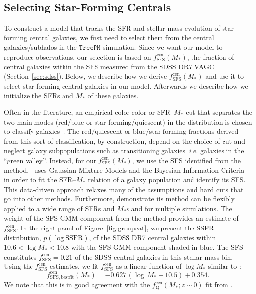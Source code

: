 \documentclass[12pt, letterpaper, preprint, tighten]{aastex62}
\newcommand{\beq}{\begin{equation}}
\newcommand{\eeq}{\end{equation}}
\begin{document}
\subsection{Selecting Star-Forming Centrals}  \label{sec:sfcen}
To construct a model that tracks the SFR and stellar mass evolution of 
star-forming central galaxies, we first need to select them from the 
central galaxies/subhalos in the $\mathtt{TreePM}$ simulation. Since 
we want our model to reproduce observations, our selection is based 
on $f^\mathrm{cen}_\mathrm{SFS}(M_*)$, the fraction of central galaxies 
within the SFS measured from the SDSS DR7 VAGC (Section~\ref{sec:sdss}). 
Below, we describe how we derive $f^\mathrm{cen}_\mathrm{SFS}(M_*)$ and 
use it to select star-forming central galaxies in our model. Afterwards 
we describe how we initialize the SFRs and $M_*$ of these galaxies.

Often in the literature, an empirical color-color or SFR--$M_*$ cut 
that separates the two main modes (red/blue or star-forming/quiescent) 
in the distribution is chosen to classify 
galaxies~\citep[\emph{e.g.}][]{baldry2006, blanton2009, drory2009, peng2010, moustakas2013, hahn2015}.
The red/quiescent or blue/star-forming fractions derived from this sort 
of classification, by construction, depend on the choice of cut and 
neglect galaxy subpopulations such as transitioning galaxies~\emph{i.e.} 
galaxies in the ``green valley''. Instead, for our $f^\mathrm{cen}_\mathrm{SFS}(M_*)$, 
we use the SFS identified from the \cite{hahn2018a} method. \cite{hahn2018a}~uses Gaussian 
Mixture Models and the Bayesian Information Criteria in order to fit the 
SFR--$M_*$ relation of a galaxy population and identify its SFS. This 
data-driven approach relaxes many of the assumptions and hard cuts that 
go into other methods. Furthermore, \cite{hahn2018a} demonstrate its method can 
be flexibly applied to a wide range of SFRs and $M_*$s and for multiple 
simulations. The weight of the SFS GMM component from the method provides 
an estimate of $f^\mathrm{cen}_\mathrm{SFS}$. In the right panel of 
Figure~\ref{fig:groupcat}, we present the SSFR distribution, $p(\log \mathrm{SSFR})$,
of the SDSS DR7 central galaxies within $10.6 < \log M_* < 10.8$ with 
the SFS GMM component shaded in blue. 
The SFS constitutes $f^\mathrm{cen}_\mathrm{SFS} = 0.21$ of the SDSS 
central galaxies in this stellar mass bin. Using the $f^\mathrm{cen}_\mathrm{SFS}$ 
estimates, we fit $f^\mathrm{cen}_\mathrm{SFS}$ as a linear function of 
$\log M_*$ similar to \cite{wetzel2013,hahn2017b}: 
\beq \label{eq:f_cen_sfms}
f^\mathrm{cen}_\mathrm{SFS, bestfit}(M_*) = -0.627\,(\log\,M_* - 10.5) + 0.354. 
\eeq
We note that this is in good agreement with the $f_\mathrm{Q}^\mathrm{cen}(M_*; z \sim 0)$ 
fit from \cite{hahn2017b}. 
\end{document}
